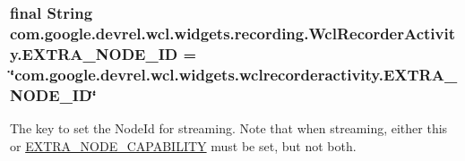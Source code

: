 \subsubsection[{\texorpdfstring{E\+X\+T\+R\+A\+\_\+\+N\+O\+D\+E\+\_\+\+ID}{EXTRA_NODE_ID}}]{\setlength{\rightskip}{0pt plus 5cm}final String com.\+google.\+devrel.\+wcl.\+widgets.\+recording.\+Wcl\+Recorder\+Activity.\+E\+X\+T\+R\+A\+\_\+\+N\+O\+D\+E\+\_\+\+ID = \char`\"{}com.\+google.\+devrel.\+wcl.\+widgets.\+wclrecorderactivity.\+E\+X\+T\+R\+A\+\_\+\+N\+O\+D\+E\+\_\+\+ID\char`\"{}\hspace{0.3cm}{\ttfamily [static]}}\hypertarget{classcom_1_1google_1_1devrel_1_1wcl_1_1widgets_1_1recording_1_1WclRecorderActivity_af9724d687c9bc9c09865a162767767a0}{}\label{classcom_1_1google_1_1devrel_1_1wcl_1_1widgets_1_1recording_1_1WclRecorderActivity_af9724d687c9bc9c09865a162767767a0}
The key to set the Node\+Id for streaming. Note that when streaming, either this or \hyperlink{classcom_1_1google_1_1devrel_1_1wcl_1_1widgets_1_1recording_1_1WclRecorderActivity_a7bd0e0e31dfd9a6a1378bc5998470e65}{E\+X\+T\+R\+A\+\_\+\+N\+O\+D\+E\+\_\+\+C\+A\+P\+A\+B\+I\+L\+I\+TY} must be set, but not both. 
